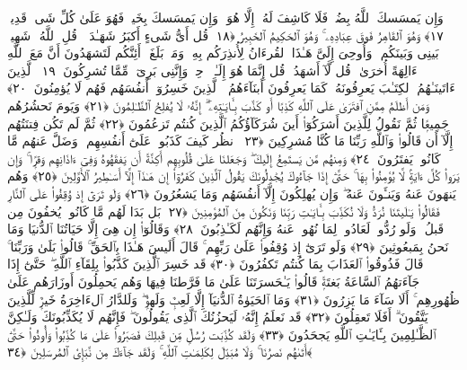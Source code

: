  وَإِن يَمسَسكَ ٱللَّهُ بِضُرٍّۢ فَلَا كَاشِفَ لَهُۥٓ إِلَّا هُوَ ۖ وَإِن يَمسَسكَ بِخَيرٍۢ فَهُوَ عَلَىٰ كُلِّ شَىءٍۢ قَدِيرٌۭ ﴿١٧﴾
 وَهُوَ ٱلقَاهِرُ فَوقَ عِبَادِهِۦ ۚ وَهُوَ ٱلحَكِيمُ ٱلخَبِيرُ ﴿١٨﴾
 قُل أَىُّ شَىءٍ أَكبَرُ شَهَـٰدَةًۭ ۖ قُلِ ٱللَّهُ ۖ شَهِيدٌۢ بَينِى وَبَينَكُم ۚ وَأُوحِىَ إِلَىَّ هَـٰذَا ٱلقُرءَانُ لِأُنذِرَكُم بِهِۦ وَمَنۢ بَلَغَ ۚ أَئِنَّكُم لَتَشهَدُونَ أَنَّ مَعَ ٱللَّهِ ءَالِهَةً أُخرَىٰ ۚ قُل لَّآ أَشهَدُ ۚ قُل إِنَّمَا هُوَ إِلَـٰهٌۭ وَٟحِدٌۭ وَإِنَّنِى بَرِىٓءٌۭ مِّمَّا تُشرِكُونَ ﴿١٩﴾
 ٱلَّذِينَ ءَاتَينَـٰهُمُ ٱلكِتَـٰبَ يَعرِفُونَهُۥ كَمَا يَعرِفُونَ أَبنَآءَهُمُ ۘ ٱلَّذِينَ خَسِرُوٓا۟ أَنفُسَهُم فَهُم لَا يُؤمِنُونَ ﴿٢٠﴾
 وَمَن أَظلَمُ مِمَّنِ ٱفتَرَىٰ عَلَى ٱللَّهِ كَذِبًا أَو كَذَّبَ بِـَٔايَـٰتِهِۦٓ ۗ إِنَّهُۥ لَا يُفلِحُ ٱلظَّـٰلِمُونَ ﴿٢١﴾
 وَيَومَ نَحشُرُهُم جَمِيعًۭا ثُمَّ نَقُولُ لِلَّذِينَ أَشرَكُوٓا۟ أَينَ شُرَكَآؤُكُمُ ٱلَّذِينَ كُنتُم تَزعُمُونَ ﴿٢٢﴾
 ثُمَّ لَم تَكُن فِتنَتُهُم إِلَّآ أَن قَالُوا۟ وَٱللَّهِ رَبِّنَا مَا كُنَّا مُشرِكِينَ ﴿٢٣﴾
 ٱنظُر كَيفَ كَذَبُوا۟ عَلَىٰٓ أَنفُسِهِم ۚ وَضَلَّ عَنهُم مَّا كَانُوا۟ يَفتَرُونَ ﴿٢٤﴾
 وَمِنهُم مَّن يَستَمِعُ إِلَيكَ ۖ وَجَعَلنَا عَلَىٰ قُلُوبِهِم أَكِنَّةً أَن يَفقَهُوهُ وَفِىٓ ءَاذَانِهِم وَقرًۭا ۚ وَإِن يَرَوا۟ كُلَّ ءَايَةٍۢ لَّا يُؤمِنُوا۟ بِهَا ۚ حَتَّىٰٓ إِذَا جَآءُوكَ يُجَٰدِلُونَكَ يَقُولُ ٱلَّذِينَ كَفَرُوٓا۟ إِن هَـٰذَآ إِلَّآ أَسَـٰطِيرُ ٱلأَوَّلِينَ ﴿٢٥﴾
 وَهُم يَنهَونَ عَنهُ وَيَنـَٔونَ عَنهُ ۖ وَإِن يُهلِكُونَ إِلَّآ أَنفُسَهُم وَمَا يَشعُرُونَ ﴿٢٦﴾
 وَلَو تَرَىٰٓ إِذ وُقِفُوا۟ عَلَى ٱلنَّارِ فَقَالُوا۟ يَـٰلَيتَنَا نُرَدُّ وَلَا نُكَذِّبَ بِـَٔايَـٰتِ رَبِّنَا وَنَكُونَ مِنَ ٱلمُؤمِنِينَ ﴿٢٧﴾
 بَل بَدَا لَهُم مَّا كَانُوا۟ يُخفُونَ مِن قَبلُ ۖ وَلَو رُدُّوا۟ لَعَادُوا۟ لِمَا نُهُوا۟ عَنهُ وَإِنَّهُم لَكَـٰذِبُونَ ﴿٢٨﴾
 وَقَالُوٓا۟ إِن هِىَ إِلَّا حَيَاتُنَا ٱلدُّنيَا وَمَا نَحنُ بِمَبعُوثِينَ ﴿٢٩﴾
 وَلَو تَرَىٰٓ إِذ وُقِفُوا۟ عَلَىٰ رَبِّهِم ۚ قَالَ أَلَيسَ هَـٰذَا بِٱلحَقِّ ۚ قَالُوا۟ بَلَىٰ وَرَبِّنَا ۚ قَالَ فَذُوقُوا۟ ٱلعَذَابَ بِمَا كُنتُم تَكفُرُونَ ﴿٣٠﴾
 قَد خَسِرَ ٱلَّذِينَ كَذَّبُوا۟ بِلِقَآءِ ٱللَّهِ ۖ حَتَّىٰٓ إِذَا جَآءَتهُمُ ٱلسَّاعَةُ بَغتَةًۭ قَالُوا۟ يَـٰحَسرَتَنَا عَلَىٰ مَا فَرَّطنَا فِيهَا وَهُم يَحمِلُونَ أَوزَارَهُم عَلَىٰ ظُهُورِهِم ۚ أَلَا سَآءَ مَا يَزِرُونَ ﴿٣١﴾
 وَمَا ٱلحَيَوٰةُ ٱلدُّنيَآ إِلَّا لَعِبٌۭ وَلَهوٌۭ ۖ وَلَلدَّارُ ٱلءَاخِرَةُ خَيرٌۭ لِّلَّذِينَ يَتَّقُونَ ۗ أَفَلَا تَعقِلُونَ ﴿٣٢﴾
 قَد نَعلَمُ إِنَّهُۥ لَيَحزُنُكَ ٱلَّذِى يَقُولُونَ ۖ فَإِنَّهُم لَا يُكَذِّبُونَكَ وَلَـٰكِنَّ ٱلظَّـٰلِمِينَ بِـَٔايَـٰتِ ٱللَّهِ يَجحَدُونَ ﴿٣٣﴾
 وَلَقَد كُذِّبَت رُسُلٌۭ مِّن قَبلِكَ فَصَبَرُوا۟ عَلَىٰ مَا كُذِّبُوا۟ وَأُوذُوا۟ حَتَّىٰٓ أَتَىٰهُم نَصرُنَا ۚ وَلَا مُبَدِّلَ لِكَلِمَـٰتِ ٱللَّهِ ۚ وَلَقَد جَآءَكَ مِن نَّبَإِى۟ ٱلمُرسَلِينَ ﴿٣٤﴾
